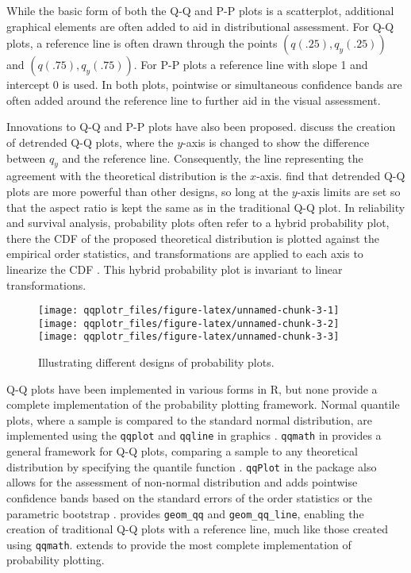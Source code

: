 While the basic form of both the Q-Q and P-P plots is a scatterplot,
additional graphical elements are often added to aid in distributional
assessment. For Q-Q plots, a reference line is often drawn through the
points \((q(.25), q_y(.25))\) and \((q(.75), q_y(.75))\). For P-P plots
a reference line with slope 1 and intercept 0 is used. In both plots,
pointwise or simultaneous confidence bands are often added around the
reference line to further aid in the visual assessment.

Innovations to Q-Q and P-P plots have also been proposed.
\citet{Loy2016-fg} discuss the creation of detrended Q-Q plots, where
the \(y\)-axis is changed to show the difference between \(q_y\) and the
reference line. Consequently, the line representing the agreement with
the theoretical distribution is the \(x\)-axis. \citet{Loy2016-fg} find
that detrended Q-Q plots are more powerful than other designs, so long
at the \(y\)-axis limits are set so that the aspect ratio is kept the
same as in the traditional Q-Q plot. In reliability and survival
analysis, probability plots often refer to a hybrid probability plot,
there the CDF of the proposed theoretical distribution is plotted
against the empirical order statistics, and transformations are applied
to each axis to linearize the CDF \citep[cf.][chapter 6]{Meeker1998}.
This hybrid probability plot is invariant to linear transformations.

\begin{Schunk}
\begin{figure}

{\centering \texttt{[image: qqplotr\_files/figure-latex/unnamed-chunk-3-1]} \texttt{[image: qqplotr\_files/figure-latex/unnamed-chunk-3-2]} \texttt{[image: qqplotr\_files/figure-latex/unnamed-chunk-3-3]} 

}

\caption{\label{fig:pp-designs}Illustrating different designs of probability plots.}\label{fig:unnamed-chunk-3}
\end{figure}
\end{Schunk}

Q-Q plots have been implemented in various forms in R, but none provide
a complete implementation of the probability plotting framework. Normal
quantile plots, where a sample is compared to the standard normal
distribution, are implemented using the \texttt{qqplot} and
\texttt{qqline} in  graphics \citep{R}. \texttt{qqmath} in
 provides a general framework for Q-Q plots, comparing a
sample to any theoretical distribution by specifying the quantile
function \citep{lattice}. \texttt{qqPlot} in the  package also
allows for the assessment of non-normal distribution and adds pointwise
confidence bands based on the standard errors of the order statistics or
the parametric bootstrap \citep{car}.  provides
\texttt{geom\_qq} and \texttt{geom\_qq\_line}, enabling the creation of
traditional Q-Q plots with a reference line, much like those created
using \texttt{qqmath}.  extends  to provide
the most complete implementation of probability plotting.


